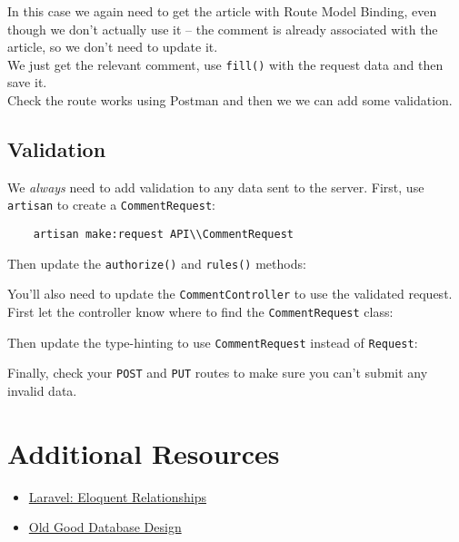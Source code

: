 In this case we again need to get the article with Route Model Binding, even though we don't actually use it – the comment is already associated with the article, so we don't need to update it.
\\

We just get the relevant comment, use \texttt{fill()} with the request data and then save it.
\\

Check the route works using Postman and then we we can add some validation.


\subsection{Validation}

We \textit{always} need to add validation to any data sent to the server. First, use \texttt{artisan} to create a \texttt{CommentRequest}:

\begin{verbatim}
    artisan make:request API\\CommentRequest
\end{verbatim}

Then update the \texttt{authorize()} and \texttt{rules()} methods:


You'll also need to update the \texttt{CommentController} to use the validated request. First let the controller know where to find the \texttt{CommentRequest} class:


Then update the type-hinting to use \texttt{CommentRequest} instead of \texttt{Request}:


Finally, check your \texttt{POST} and \texttt{PUT} routes to make sure you can't submit any invalid data.


\section{Additional Resources}

\begin{itemize}[leftmargin=*]
    \item \href{http://laravel.com/docs/7.x/eloquent-relationships}{Laravel: Eloquent Relationships}
    \item \href{https://relinx.io/2020/09/14/old-good-database-design}{Old Good Database Design}
\end{itemize}
